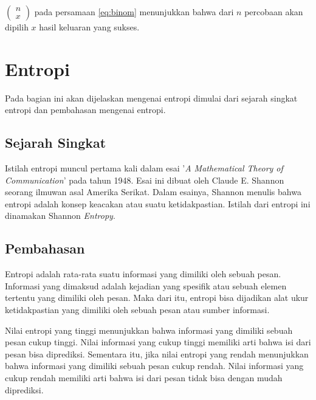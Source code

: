 \begin{math}\left( {\begin{array}{c}n \\ x \end{array}} \right)\end{math} pada persamaan \ref{eq:binom} menunjukkan bahwa dari \begin{math}n\end{math} percobaan akan dipilih \begin{math}x\end{math} hasil keluaran yang sukses.

\section{Entropi}

Pada bagian ini akan dijelaskan mengenai entropi dimulai dari sejarah singkat entropi dan pembahasan mengenai entropi.

\subsection{Sejarah Singkat}

Istilah entropi muncul pertama kali dalam esai '\textit{A Mathematical Theory of Communication}' pada tahun 1948. Esai ini dibuat oleh Claude E. Shannon seorang ilmuwan asal Amerika Serikat. Dalam esainya, Shannon menulis bahwa entropi adalah konsep keacakan atau suatu ketidakpastian\cite{shannon1948mathematical}. Istilah dari entropi ini dinamakan Shannon \textit{Entropy}.

\subsection{Pembahasan}

Entropi adalah rata-rata suatu informasi yang dimiliki oleh sebuah pesan. Informasi yang dimaksud adalah kejadian yang spesifik atau sebuah elemen tertentu yang dimiliki oleh pesan. Maka dari itu, entropi bisa dijadikan alat ukur ketidakpastian yang dimiliki oleh sebuah pesan atau sumber informasi.

Nilai entropi yang tinggi menunjukkan bahwa informasi yang dimiliki sebuah pesan cukup tinggi. Nilai informasi yang cukup tinggi memiliki arti bahwa isi dari pesan bisa diprediksi. Sementara itu, jika nilai entropi yang rendah menunjukkan bahwa informasi yang dimiliki sebuah pesan cukup rendah. Nilai informasi yang cukup rendah memiliki arti bahwa isi dari pesan tidak bisa dengan mudah diprediksi.

